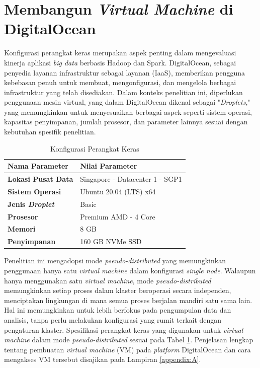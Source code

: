 \section{Membangun \textit{Virtual Machine} di DigitalOcean}
Konfigurasi perangkat keras merupakan aspek penting dalam mengevaluasi kinerja aplikasi \textit{big data} berbasis Hadoop dan Spark. DigitalOcean, sebagai penyedia layanan infrastruktur sebagai layanan (IaaS), memberikan pengguna kebebasan penuh untuk membuat, mengonfigurasi, dan mengelola berbagai infrastruktur yang telah disediakan. Dalam konteks penelitian ini, diperlukan penggunaan mesin virtual, yang dalam DigitalOcean dikenal sebagai "\textit{Droplets}," yang memungkinkan untuk menyesuaikan berbagai aspek seperti sistem operasi, kapasitas penyimpanan, jumlah prosesor, dan parameter lainnya sesuai dengan kebutuhan spesifik penelitian.

\begin{table}[h!]
	\centering
	\caption{Konfigurasi Perangkat Keras}
	\begin{tabular}{l p{9cm}} 
		\toprule
		\textbf{Nama Parameter}    & \textbf{Nilai Parameter} \\ 
        \midrule
		\textbf{Lokasi Pusat Data} & Singapore - Datacenter 1 - SGP1               \\ 
		\textbf{Sistem Operasi}    & Ubuntu 20.04 (LTS) x64                        \\
		\textbf{Jenis \textit{Droplet}}     & Basic                                         \\ 
		\textbf{Prosesor}          & Premium AMD - 4 Core                          \\ 
		\textbf{Memori}            & 8 GB                                          \\ 
		\textbf{Penyimpanan}       & 160 GB NVMe SSD                               \\ 
        \bottomrule
	\end{tabular}
	\label{table:conf-hardware}
\end{table}
Penelitian ini mengadopsi mode \textit{pseudo-distributed} yang memungkinkan penggunaan hanya satu \textit{virtual machine} dalam konfigurasi \textit{single node}. Walaupun hanya menggunakan satu \textit{virtual machine}, mode \textit{pseudo-distributed} memungkinkan setiap proses dalam klaster beroperasi secara independen, menciptakan lingkungan di mana semua proses berjalan mandiri satu sama lain. Hal ini memungkinkan untuk lebih berfokus pada pengumpulan data dan analisis, tanpa perlu melakukan konfigurasi yang rumit terkait dengan pengaturan klaster. Spesifikasi perangkat keras yang digunakan untuk \textit{virtual machine} dalam mode \textit{pseudo-distributed} sesuai pada Tabel \ref{table:conf-hardware}. Penjelasan lengkap tentang pembuatan \textit{virtual machine} (VM) pada \textit{platform} DigitalOcean dan cara mengakses VM tersebut disajikan pada Lampiran \ref{appendix:A}.


